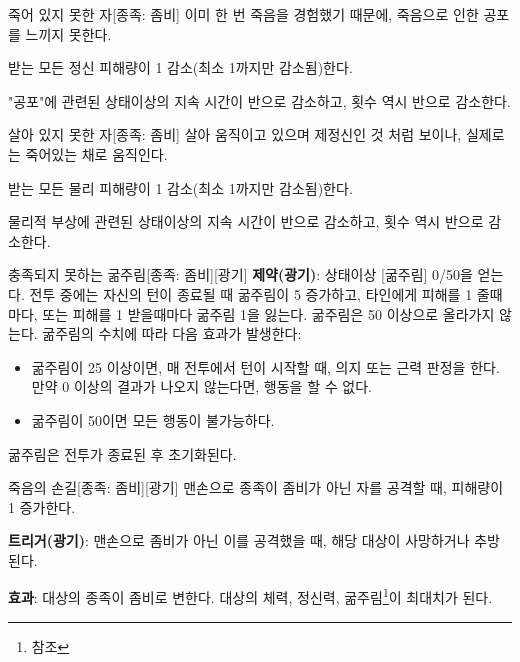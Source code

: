 \documentclass{report}
\begin{document}
	\begin{story}{죽어 있지 못한 자}{[종족: 좀비]}
		이미 한 번 죽음을 경험했기 때문에, 죽음으로 인한 공포를 느끼지 못한다.
		
		받는 모든 정신 피해량이 1 감소(최소 1까지만 감소됨)한다.
		
		"공포"에 관련된 상태이상의 지속 시간이 반으로 감소하고, 횟수 역시 반으로 감소한다.
		
		\smallskip
		
	\end{story}
	
	\begin{story}{살아 있지 못한 자}{[종족: 좀비]}
		살아 움직이고 있으며 제정신인 것 처럼 보이나, 실제로는 죽어있는 채로 움직인다.
		
		받는 모든 물리 피해량이 1 감소(최소 1까지만 감소됨)한다.
		
		물리적 부상에 관련된 상태이상의 지속 시간이 반으로 감소하고, 횟수 역시 반으로 감소한다.
		
	\end{story}
	
	\begin{story}{충족되지 못하는 굶주림}{[종족: 좀비][광기]}
		\textbf{제약(광기)}: 상태이상 [굶주림] 0/50을 얻는다. 전투 중에는 자신의 턴이 종료될 때 굶주림이 5 증가하고, 타인에게 피해를 1 줄때마다, 또는 피해를 1 받을때마다 굶주림 1을 잃는다. 굶주림은 50 이상으로 올라가지 않는다. 굶주림의 수치에 따라 다음 효과가 발생한다:
		\begin{itemize}
			\item 굶주림이 25 이상이면, 매 전투에서 턴이 시작할 때, 의지 또는 근력 판정을 한다. 만약 0 이상의 결과가 나오지 않는다면, 행동을 할 수 없다.
			\item 굶주림이 50이면 모든 행동이 불가능하다.
		\end{itemize}
		굶주림은 전투가 종료된 후 초기화된다.
		
	\end{story}
	
	\begin{story}{죽음의 손길}{[종족: 좀비][광기]}
		맨손으로 종족이 좀비가 아닌 자를 공격할 때, 피해량이 1 증가한다.
		
		\textbf{트리거(광기)}: 맨손으로 좀비가 아닌 이를 공격했을 때, 해당 대상이 사망하거나 추방된다.
		
		\textbf{효과}: 대상의 종족이 좀비로 변한다. 대상의 체력, 정신력, 굶주림\footnote{ 참조}이 최대치가 된다.
		
	\end{story}
\end{document}
